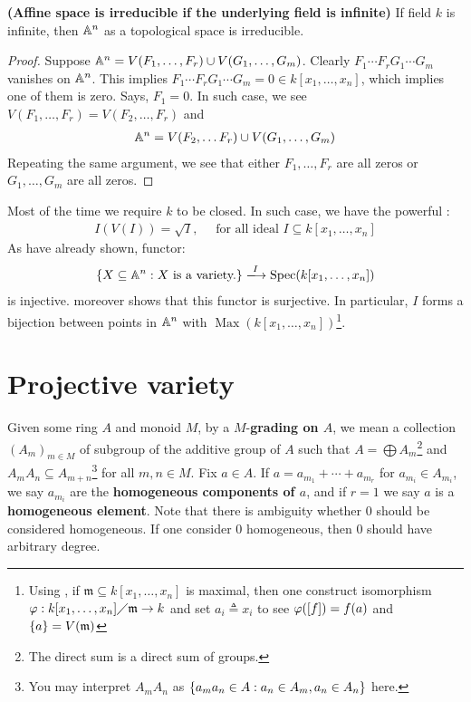\documentclass{report}
\begin{document}
\begin{corollary}
\label{Asii}
\textbf{(Affine space is irreducible if the underlying field is infinite)} If field $k$ is infinite, then $\mathbb{A}^n$ as a topological space is irreducible. 
\end{corollary}
\begin{proof}
Suppose $\mathbb{A}^n=V(F_1,\dots ,F_r)\cup V(G_1,\dots ,G_m)$. Clearly  $F_1\cdots F_rG_1\cdots G_m$ vanishes on $\mathbb{A}^n$. This implies $F_1\cdots F_rG_1\cdots G_m=0 \in k[x_1,\dots ,x_n]$, which implies one of them is zero. Says, $F_1=0$. In such case, we see $V(F_1,\dots ,F_r)=V(F_2,\dots ,F_r)$ and 
 \begin{align*}
\mathbb{A}^n=V(F_2,\dots F_r)\cup  V(G_1,\dots ,G_m)
\end{align*}
Repeating the same argument, we see that either $F_1,\dots ,F_r$ are all zeros or  $G_1,\dots ,G_m$ are all zeros. 
\end{proof}
Most of the time we require $k$ to be closed. In such case, we have the powerful :
\begin{align*}
I(V(I))=\sqrt{I},\quad \text{ for all ideal }I \subseteq k[x_1,\dots, x_n]
\end{align*}
As  have already shown, functor: 
\begin{align*}
\set{X \subseteq \A^n : X\text{ is a variety.}}\xlongrightarrow{I} \operatorname{Spec}(k[x_1,\dots,x_n])
\end{align*}
is injective.  moreover shows that this functor is surjective. In particular, $I$ forms a bijection between points in $\mathbb{A}^n$ with  $\operatorname{Max}(k[x_1,\dots ,x_n])$\footnote{Using , if $\mathfrak{m}\subseteq k[x_1,\dots ,x_n]$ is maximal, then one construct isomorphism $\pfi: k[x_1,\dots ,x_n]\quotient \mathfrak{m}\to k$ and set $a_i\triangleq x_i$ to see $\pfi([f])=f(a)$ and $\{ a \}=V(\mathfrak{m})$}. \\

\section{Projective variety}
Given some ring $A$ and monoid $M$, by a $M$-\textbf{grading on $A$}, we mean a collection $(A_m)_{m \in M}$ of subgroup of the additive group of $A$ such that $A= \bigoplus A_m$\footnote{The direct sum is a direct sum of groups.} and $A_mA_n\subseteq A_{m+n}$\footnote{You may interpret $A_mA_n$ as  $\{ a_ma_n \in A:a_n \in A_m,a_n \in A_n \}$ here.} for all $m,n \in M$. Fix $a \in A$. If $a=a_{m_1}+ \cdots + a_{m_r}$ for $a_{m_i} \in A_{m_i}$, we say $a_{m_i}$ are the \textbf{homogeneous components of $a$}, and if $r=1$ we say $a$ is a \textbf{homogeneous element}.  Note that there is  ambiguity whether $0$ should be considered homogeneous. If one consider $0$  homogeneous, then $0$ should have arbitrary degree.\\ 
\end{document}
